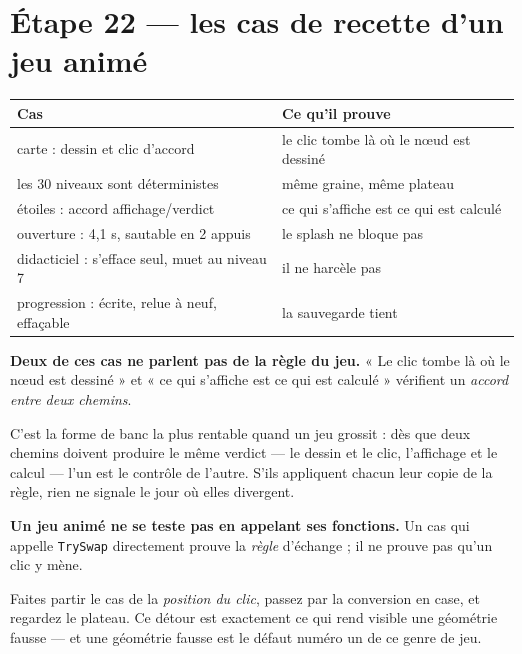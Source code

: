 \section{Étape 22 --- les cas de recette d'un jeu animé}

\begin{center}
\begin{tabular}{@{}ll@{}}
\toprule
\textbf{Cas} & \textbf{Ce qu'il prouve} \\
\midrule
carte : dessin et clic d'accord & le clic tombe là où le n\oe ud est dessiné \\
les 30 niveaux sont déterministes & même graine, même plateau \\
étoiles : accord affichage/verdict & ce qui s'affiche est ce qui est calculé \\
ouverture : 4,1 s, sautable en 2 appuis & le splash ne bloque pas \\
didacticiel : s'efface seul, muet au niveau 7 & il ne harcèle pas \\
progression : écrite, relue à neuf, effaçable & la sauvegarde tient \\
\bottomrule
\end{tabular}
\end{center}

\begin{nkretenir}
\textbf{Deux de ces cas ne parlent pas de la règle du jeu.} « Le clic tombe là où
le n\oe ud est dessiné » et « ce qui s'affiche est ce qui est calculé »
vérifient un \emph{accord entre deux chemins}.

C'est la forme de banc la plus rentable quand un jeu grossit : dès que deux
chemins doivent produire le même verdict --- le dessin et le clic, l'affichage et
le calcul --- l'un est le contrôle de l'autre. S'ils appliquent chacun leur copie
de la règle, rien ne signale le jour où elles divergent.
\end{nkretenir}

\begin{nkpiege}
\textbf{Un jeu animé ne se teste pas en appelant ses fonctions.} Un cas qui
appelle \texttt{TrySwap} directement prouve la \emph{règle} d'échange ; il ne
prouve pas qu'un clic y mène.

Faites partir le cas de la \emph{position du clic}, passez par la conversion en
case, et regardez le plateau. Ce détour est exactement ce qui rend visible une
géométrie fausse --- et une géométrie fausse est le défaut numéro un de ce genre
de jeu.
\end{nkpiege}

